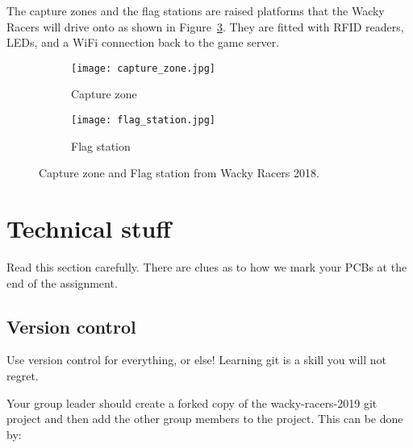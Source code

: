 \documentclass[11pt, a4paper]{article}
\begin{document}
\begin{figure}

\end{figure}


The capture zones and the flag stations are raised platforms
that the Wacky Racers will drive onto as shown in
Figure~\ref{fig:station-pictures}. They are
fitted with RFID readers, LEDs, and a WiFi connection back to the game
server.

\begin{figure}[H]
    \centering

    \begin{subfigure}{.45\textwidth}
        \centering
        \texttt{[image: capture\_zone.jpg]}
        \caption{Capture zone}
        \label{fig:capture-zone}
    \end{subfigure} \qquad %
    \begin{subfigure}{.45\textwidth}
        \centering
        \texttt{[image: flag\_station.jpg]}
        \caption{Flag station}
        \label{fig:flag-station}
    \end{subfigure}

    \caption{Capture zone and Flag station from Wacky Racers 2018.}
    \label{fig:station-pictures}

\end{figure}


\section{Technical stuff}

Read this section carefully.  There are clues as to how we mark your
PCBs at the end of the assignment.


\subsection{Version control}

Use version control for everything, or else!  Learning git is a skill
you will not regret.

Your group leader should create a forked copy of the wacky-racers-2019
git project and then add the other group members to the project.  This
can be done by:
\end{document}
